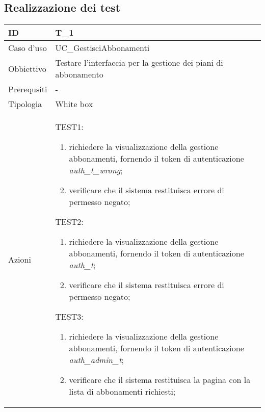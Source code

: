 
\subsection*{Realizzazione dei test}

\begin{table}[hb]
    \centering
    \begin{tabular}{ |p{2cm}|p{10cm}|  }
        \hline
        ID & T\_1 \\\hline
        Caso d'uso & UC\_GestisciAbbonamenti \\\hline   
        Obbiettivo & Testare l'interfaccia per la gestione dei piani di abbonamento \\\hline
        Prerequsiti & - \\\hline
        Tipologia & White box \\\hline
        Azioni & 
        TEST1:
        \begin{enumerate}[topsep=0pt]
            \item richiedere la visualizzazione della gestione abbonamenti, fornendo il token di autenticazione \emph{auth\_t\_wrong};
            \item verificare che il sistema restituisca errore di permesso negato;
        \end{enumerate}
        \vspace{0.5cm} TEST2:
        \begin{enumerate}[topsep=0pt]
            \item richiedere la visualizzazione della gestione abbonamenti, fornendo il token di autenticazione \emph{auth\_t};
            \item verificare che il sistema restituisca errore di permesso negato;
        \end{enumerate}
        \vspace{0.5cm}TEST3:
        \begin{enumerate}[topsep=0pt]
            \item richiedere la visualizzazione della gestione abbonamenti, fornendo il token di autenticazione \emph{auth\_admin\_t};
            \item verificare che il sistema restituisca la pagina con la lista di abbonamenti richiesti;
        \end{enumerate}
        \\\hline
    \end{tabular}
\end{table}

